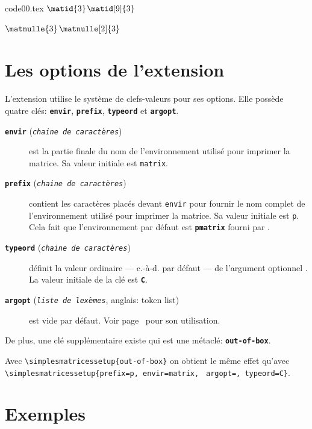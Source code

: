 \documentclass[full]{l3doc}
\newcommand\BOP{\discretionary{}{}{}}
\newcommand{\ObjetPres}[2]{\textcolor{#1}{\textbf{\texttt{#2}}}}
\newcommand{\keyname}{\ObjetPres{keycolor}}
\newcommand{\envir}{\ObjetPres{keyword20}}
\newcommand{\TypeMat}{\ObjetPres{keyword30}}
\newcommand{\UnExemple}{%
  \par \medskip \par \noindent
  \begin{minipage}[c]{0.66\linewidth}
    
  \end{minipage}
  \hspace{\stretch{1}}
  \begin{minipage}[c]{0.32\linewidth}
    \small
    
  \end{minipage}
  \par \medbreak}
\begin{document}
\begin{VerbatimOut}[gobble=0]{code00.tex}
$\matid{3}$\qquad $\matid[9]{3}$
\par \medskip
$\matnulle{3}$\qquad $\matnulle[2]{3}$
\end{VerbatimOut}
\UnExemple{}


\section{Les options de l'extension}
\label{sec:clefs}

L'extension utilise le système de clefs-valeurs pour ses options. Elle possède
quatre clés: \keyname{envir}, \keyname{prefix}, \keyname{typeord} et \keyname{argopt}.

\begin{description}
\item[\keyname{envir} (\textit{\texttt{chaine de caractères}})] est la partie
  finale du nom de l'environnement utilisé pour imprimer la matrice. Sa valeur
  initiale est \texttt{matrix}.\label{key-envir}

\item[\keyname{prefix} (\textit{\texttt{chaine de caractères}})] contient les
  caractères placés devant \texttt{envir} pour fournir le nom complet de
  l'environnement utilisé pour imprimer la matrice. Sa valeur initiale est
  \texttt{p}. Cela fait que l'environnement par défaut est \envir{pmatrix}
  fourni par .\label{key-prefix}

\item[\keyname{typeord} (\textit{\texttt{chaine de caractères}})] définit la
  valeur ordinaire --- c.-à-d. par défaut --- de l'argument optionnel
  . La valeur initiale de la clé est \TypeMat{C}.\label{key-typeord}

\item[\keyname{argopt} (\textit{\texttt{liste de lexèmes}}, anglais:
  \foreignlanguage{english}{token list})] est vide par défaut. Voir
  page~\pageref{sec:delarray} pour son utilisation.\label{key-argopt}
\end{description}

De plus, une clé supplémentaire existe qui est une métaclé:
\keyname{out-of-box}.

 Avec
\lstinline|\simplesmatricessetup{out-of-box}|
 on obtient le même effet qu'avec
\lstinline|\simplesmatricessetup{prefix=p,|\BOP\lstinline| envir=matrix,|%
  \BOP\lstinline| argopt=,|\BOP\lstinline| typeord=C}|.

\section{Exemples}
\label{sec:exemples}
\end{document}
